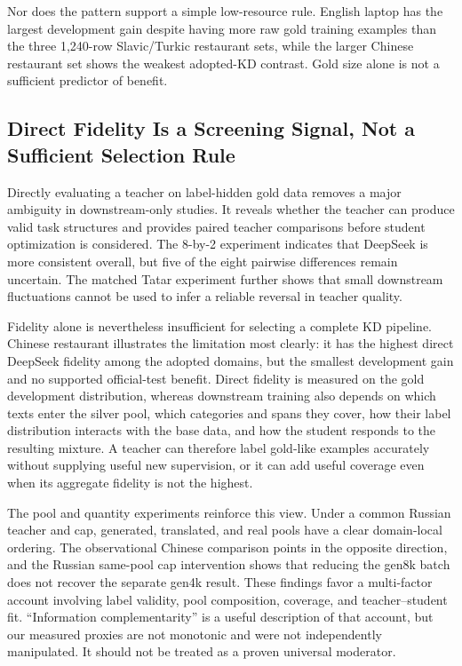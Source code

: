 Nor does the pattern support a simple low-resource rule. English laptop
has the largest development gain despite having more raw gold training
examples than the three 1,240-row Slavic/Turkic restaurant sets, while
the larger Chinese restaurant set shows the weakest adopted-KD contrast.
Gold size alone is not a sufficient predictor of benefit.

\subsection{Direct Fidelity Is a Screening Signal, Not a Sufficient
Selection
Rule}\label{direct-fidelity-is-a-screening-signal-not-a-sufficient-selection-rule}

Directly evaluating a teacher on label-hidden gold data removes a major
ambiguity in downstream-only studies. It reveals whether the teacher can
produce valid task structures and provides paired teacher comparisons
before student optimization is considered. The 8-by-2 experiment
indicates that DeepSeek is more consistent overall, but five of the
eight pairwise differences remain uncertain. The matched Tatar
experiment further shows that small downstream fluctuations cannot be
used to infer a reliable reversal in teacher quality.

Fidelity alone is nevertheless insufficient for selecting a complete KD
pipeline. Chinese restaurant illustrates the limitation most clearly: it
has the highest direct DeepSeek fidelity among the adopted domains, but
the smallest development gain and no supported official-test benefit.
Direct fidelity is measured on the gold development distribution,
whereas downstream training also depends on which texts enter the silver
pool, which categories and spans they cover, how their label
distribution interacts with the base data, and how the student responds
to the resulting mixture. A teacher can therefore label gold-like
examples accurately without supplying useful new supervision, or it can
add useful coverage even when its aggregate fidelity is not the highest.

The pool and quantity experiments reinforce this view. Under a common
Russian teacher and cap, generated, translated, and real pools have a
clear domain-local ordering. The observational Chinese comparison points
in the opposite direction, and the Russian same-pool cap intervention
shows that reducing the gen8k batch does not recover the separate gen4k
result. These findings favor a multi-factor account involving label
validity, pool composition, coverage, and teacher--student fit.
``Information complementarity'' is a useful description of that account,
but our measured proxies are not monotonic and were not independently
manipulated. It should not be treated as a proven universal moderator.

